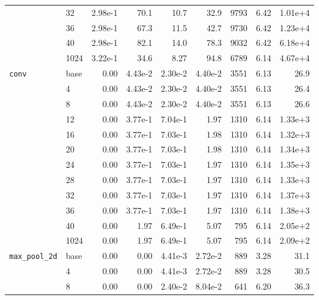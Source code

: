 \begin{longtable}{llrrrrrrr}
\cmidrule{2-9}
         & 32   &   2.98e-1 & 70.1 & 10.7 & 32.9 &    9793 &     6.42 & 1.01e+4 \\
\cmidrule{2-9}
         & 36   &   2.98e-1 & 67.3 & 11.5 & 42.7 &    9730 &     6.42 & 1.23e+4 \\
\cmidrule{2-9}
         & 40   &   2.98e-1 & 82.1 & 14.0 & 78.3 &    9032 &     6.42 & 6.18e+4 \\
\cmidrule{2-9}
         & 1024 &   3.22e-1 & 34.6 & 8.27 & 94.8 &    6789 &     6.14 & 4.67e+4 \\
\midrule
\texttt{conv} & base &   0.00 & 4.43e-2 & 2.30e-2 & 4.40e-2 &    3551 &     6.13 & 26.9 \\
\cmidrule{2-9}
         & 4    &   0.00 & 4.43e-2 & 2.30e-2 & 4.40e-2 &    3551 &     6.13 & 26.4 \\
\cmidrule{2-9}
         & 8    &   0.00 & 4.43e-2 & 2.30e-2 & 4.40e-2 &    3551 &     6.13 & 26.6 \\
\cmidrule{2-9}
         & 12   &   0.00 & 3.77e-1 & 7.04e-1 & 1.97 &    1310 &     6.14 & 1.33e+3 \\
\cmidrule{2-9}
         & 16   &   0.00 & 3.77e-1 & 7.03e-1 & 1.98 &    1310 &     6.14 & 1.32e+3 \\
\cmidrule{2-9}
         & 20   &   0.00 & 3.77e-1 & 7.03e-1 & 1.98 &    1310 &     6.14 & 1.34e+3 \\
\cmidrule{2-9}
         & 24   &   0.00 & 3.77e-1 & 7.03e-1 & 1.97 &    1310 &     6.14 & 1.35e+3 \\
\cmidrule{2-9}
         & 28   &   0.00 & 3.77e-1 & 7.03e-1 & 1.97 &    1310 &     6.14 & 1.33e+3 \\
\cmidrule{2-9}
         & 32   &   0.00 & 3.77e-1 & 7.03e-1 & 1.97 &    1310 &     6.14 & 1.37e+3 \\
\cmidrule{2-9}
         & 36   &   0.00 & 3.77e-1 & 7.03e-1 & 1.97 &    1310 &     6.14 & 1.38e+3 \\
\cmidrule{2-9}
         & 40   &   0.00 & 1.97 & 6.49e-1 & 5.07 &     795 &     6.14 & 2.05e+2 \\
\cmidrule{2-9}
         & 1024 &   0.00 & 1.97 & 6.49e-1 & 5.07 &     795 &     6.14 & 2.09e+2 \\
\midrule
\texttt{max\_pool\_2d} & base &   0.00 & 0.00 & 4.41e-3 & 2.72e-2 &     889 &     3.28 & 31.1 \\
\cmidrule{2-9}
         & 4    &   0.00 & 0.00 & 4.41e-3 & 2.72e-2 &     889 &     3.28 & 30.5 \\
\cmidrule{2-9}
         & 8    &   0.00 & 0.00 & 2.40e-2 & 8.04e-2 &     641 &     6.20 & 36.3 \\

\end{longtable}
